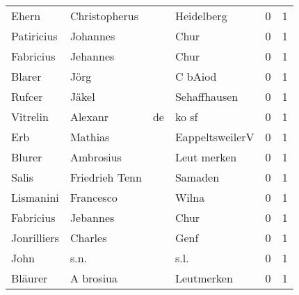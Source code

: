 \begin{center}
\begin{tiny}
\begin{longtabu}{llllrr}
                    Ehern &                      Christopherus &             &                                  Heidelberg &          0 &         1 \\
               Patiricius &                           Johannes &             &                                        Chur &          0 &         1 \\
                Fabricius &                           Jehannes &             &                                        Chur &          0 &         1 \\
                   Blarer &                               Jörg &             &                                     C bAiod &          0 &         1 \\
                   Rufcer &                              Jäkel &             &                                Sehaffhausen &          0 &         1 \\
                 Vitrelin &                            Alexanr &          de &                                       ko sf &          0 &         1 \\
                      Erb &                            Mathias &             &                             EappeltsweilerV &          0 &         1 \\
                   Blurer &                          Ambrosius &             &                                 Leut merken &          0 &         1 \\
                    Salis &                     Friedrieh Tenn &             &                                     Samaden &          0 &         1 \\
                Lismanini &                          Francesco &             &                                       Wilna &          0 &         1 \\
                Fabricius &                           Jebannes &             &                                        Chur &          0 &         1 \\
              Jonrilliers &                            Charles &             &                                        Genf &          0 &         1 \\
                     John &                               s.n. &             &                                        s.l. &          0 &         1 \\
                  Bläurer &                          A brosiua &             &                                  Leutmerken &          0 &         1 \\

\end{longtabu}
\end{tiny}
\end{center}
